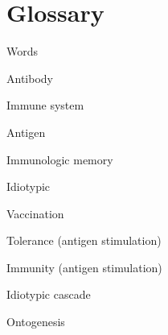 \section{Glossary}

Words

Antibody

Immune system

Antigen

Immunologic memory

Idiotypic

Vaccination

Tolerance (antigen stimulation)

Immunity (antigen stimulation)

Idiotypic cascade

Ontogenesis

\pagebreak